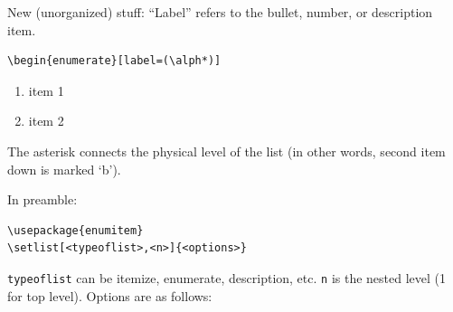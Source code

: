 \documentclass{article}
\begin{document}
New (unorganized) stuff:
``Label'' refers to the bullet, number, or description item.
\begin{lstlisting}
\begin{enumerate}[label=(\alph*)]
\end{lstlisting}

\begin{enumerate}[label=(\alph*)]
    \item item 1
    \item item 2
\end{enumerate}
The asterisk connects the physical level of the list
(in other words, second item down is marked `b').


In preamble:
\begin{verbatim}
\usepackage{enumitem}
\setlist[<typeoflist>,<n>]{<options>}
\end{verbatim}
\verb|typeoflist| can be itemize, enumerate, description, etc.
\verb|n| is the nested level (1 for top level). Options are as follows:
\end{document}
